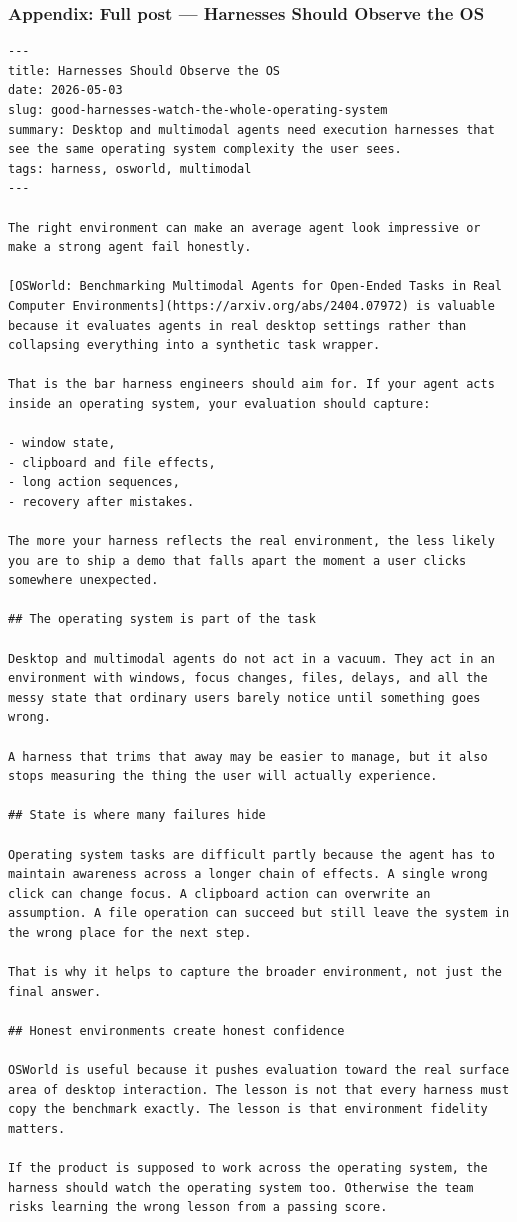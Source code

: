 \documentclass[aspectratio=169]{beamer}
\begin{document}
\begin{frame}[fragile]
\frametitle{Appendix: Full post — Harnesses Should Observe the OS}
\begin{verbatim}
---
title: Harnesses Should Observe the OS
date: 2026-05-03
slug: good-harnesses-watch-the-whole-operating-system
summary: Desktop and multimodal agents need execution harnesses that see the same operating system complexity the user sees.
tags: harness, osworld, multimodal
---

The right environment can make an average agent look impressive or make a strong agent fail honestly.

[OSWorld: Benchmarking Multimodal Agents for Open-Ended Tasks in Real Computer Environments](https://arxiv.org/abs/2404.07972) is valuable because it evaluates agents in real desktop settings rather than collapsing everything into a synthetic task wrapper.

That is the bar harness engineers should aim for. If your agent acts inside an operating system, your evaluation should capture:

- window state,
- clipboard and file effects,
- long action sequences,
- recovery after mistakes.

The more your harness reflects the real environment, the less likely you are to ship a demo that falls apart the moment a user clicks somewhere unexpected.

## The operating system is part of the task

Desktop and multimodal agents do not act in a vacuum. They act in an environment with windows, focus changes, files, delays, and all the messy state that ordinary users barely notice until something goes wrong.

A harness that trims that away may be easier to manage, but it also stops measuring the thing the user will actually experience.

## State is where many failures hide

Operating system tasks are difficult partly because the agent has to maintain awareness across a longer chain of effects. A single wrong click can change focus. A clipboard action can overwrite an assumption. A file operation can succeed but still leave the system in the wrong place for the next step.

That is why it helps to capture the broader environment, not just the final answer.

## Honest environments create honest confidence

OSWorld is useful because it pushes evaluation toward the real surface area of desktop interaction. The lesson is not that every harness must copy the benchmark exactly. The lesson is that environment fidelity matters.

If the product is supposed to work across the operating system, the harness should watch the operating system too. Otherwise the team risks learning the wrong lesson from a passing score.
\end{verbatim}
\end{frame}
\end{document}
